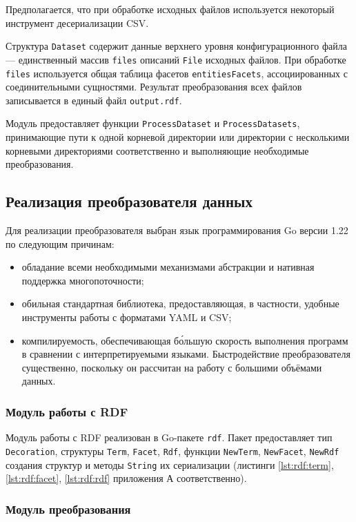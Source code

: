 Предполагается, что при обработке исходных файлов используется некоторый инструмент десериализации CSV.

Структура \texttt{Dataset} содержит данные верхнего уровня конфигурационного файла --- единственный массив
\texttt{files} описаний \texttt{File} исходных файлов. При обработке \texttt{files} используется общая таблица фасетов
\texttt{entitiesFacets}, ассоциированных с соединительными сущностями. Результат преобразования всех файлов записывается
в единый файл \texttt{output.rdf}.

Модуль предоставляет функции \texttt{ProcessDataset} и \texttt{ProcessDatasets}, принимающие пути к одной корневой
директории или директории с несколькими корневыми директориями соответственно и выполняющие необходимые преобразования.

\subsection{Реализация преобразователя данных}

Для реализации преобразователя выбран язык программирования Go версии 1.22 по следующим причинам:
\begin{itemize}
  \item обладание всеми необходимыми механизмами абстракции и нативная поддержка многопоточности;
  \item обильная стандартная библиотека, предоставляющая, в частности, удобные инструменты работы с форматами YAML и
    CSV;
  \item компилируемость, обеспечивающая б\'{о}льшую скорость выполнения программ в сравнении с интерпретируемыми
    языками. Быстродействие преобразователя существенно, поскольку он рассчитан на работу с большими объёмами данных. 
\end{itemize}

\subsubsection{Модуль работы с RDF}

Модуль работы с RDF реализован в Go-пакете \texttt{rdf}. Пакет предоставляет тип \texttt{Decoration}, структуры
\texttt{Term}, \texttt{Facet}, \texttt{Rdf}, функции \texttt{NewTerm}, \texttt{NewFacet}, \texttt{NewRdf}
создания структур и методы \texttt{String} их сериализации (листинги \ref{lst:rdf:term}, \ref{lst:rdf:facet},
\ref{lst:rdf:rdf} приложения А соответственно).

\subsubsection{Модуль преобразования}

